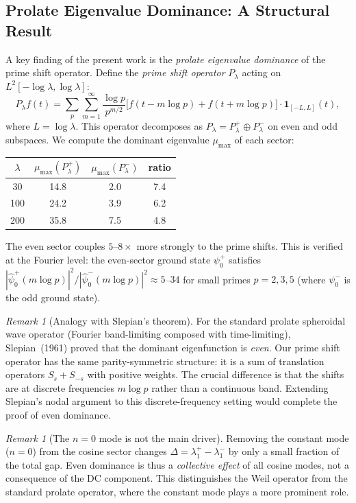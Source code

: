 \documentclass[12pt,a4paper]{article}
\theoremstyle{definition}
\theoremstyle{remark}
\newtheorem{remark}[theorem]{Remark}
\begin{document}
\subsection{Prolate Eigenvalue Dominance: A Structural Result}

A key finding of the present work is the \emph{prolate eigenvalue dominance} of the prime shift operator. Define the \emph{prime shift operator} $P_\lambda$ acting on $L^2[-\log\lambda, \log\lambda]$:
\[ P_\lambda f(t) = \sum_p \sum_{m=1}^\infty \frac{\log p}{p^{m/2}} \bigl[f(t - m\log p) + f(t + m\log p)\bigr] \cdot \mathbf{1}_{[-L,L]}(t), \]
where $L = \log\lambda$. This operator decomposes as $P_\lambda = P_\lambda^+ \oplus P_\lambda^-$ on even and odd subspaces. We compute the dominant eigenvalue $\mu_{\max}$ of each sector:

\begin{center}
\begin{tabular}{cccc}
$\lambda$ & $\mu_{\max}(P_\lambda^+)$ & $\mu_{\max}(P_\lambda^-)$ & ratio \\
\hline
30  & 14.8 &  2.0 & 7.4 \\
100 & 24.2 &  3.9 & 6.2 \\
200 & 35.8 &  7.5 & 4.8
\end{tabular}
\end{center}

The even sector couples $5$--$8\times$ more strongly to the prime shifts. This is verified at the Fourier level: the even-sector ground state $\psi_0^+$ satisfies $|\hat\psi_0^+(m\log p)|^2 / |\hat\psi_0^-(m\log p)|^2 \approx 5$--$34$ for small primes $p = 2,3,5$ (where $\psi_0^-$ is the odd ground state).

\begin{remark}[Analogy with Slepian's theorem]
For the standard prolate spheroidal wave operator (Fourier band-limiting composed with time-limiting), Slepian~(1961) proved that the dominant eigenfunction is \emph{even}. Our prime shift operator has the same parity-symmetric structure: it is a sum of translation operators $S_s + S_{-s}$ with positive weights. The crucial difference is that the shifts are at discrete frequencies $m\log p$ rather than a continuous band. Extending Slepian's nodal argument to this discrete-frequency setting would complete the proof of even dominance.
\end{remark}

\begin{remark}[The $n=0$ mode is not the main driver]
Removing the constant mode ($n=0$) from the cosine sector changes $\Delta = \lambda_1^+ - \lambda_1^-$ by only a small fraction of the total gap. Even dominance is thus a \emph{collective effect} of all cosine modes, not a consequence of the DC component. This distinguishes the Weil operator from the standard prolate operator, where the constant mode plays a more prominent role.
\end{remark}
\end{document}
